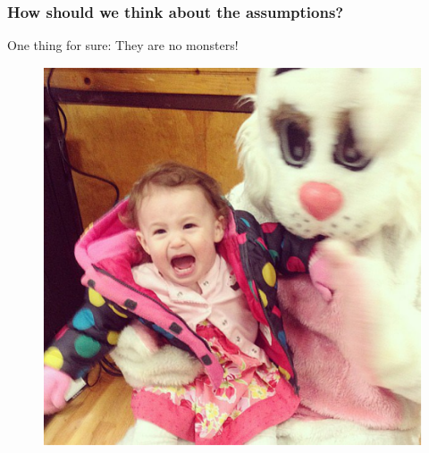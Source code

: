 \documentclass{beamer}
\begin{document}
\begin{frame}
  \frametitle{How should we think about the assumptions?}
  \begin{center}
    One thing for sure: They are no monsters!
  \end{center}
  \begin{figure}
    \centering
    \includegraphics[scale = 0.3]{../images/no_monster.png}
  \end{figure}

\end{frame}
\end{document}
